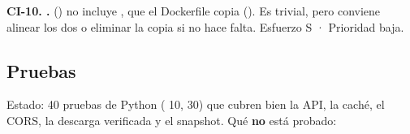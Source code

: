 \textbf{CI-10. .}  () no incluye , que el Dockerfile copia (). Es trivial, pero conviene alinear los dos o eliminar la copia si no hace falta. Esfuerzo S · Prioridad baja.

\subsection{Pruebas}

Estado: 40 pruebas de Python ( 10,  30) que cubren bien la API, la caché, el CORS, la descarga verificada y el snapshot. Qué \textbf{no} está probado:

